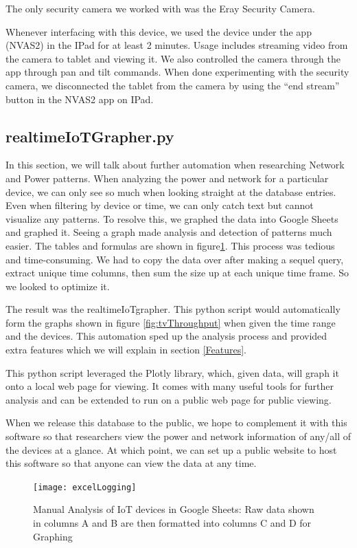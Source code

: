 The only security camera we worked with was the Eray Security Camera.

Whenever interfacing with this device, we used the device under the app (NVAS2) in the IPad for at least 2 minutes. Usage includes streaming video from the camera to tablet and viewing it. We also controlled the camera through the app through pan and tilt commands. When done experimenting with the security camera, we disconnected the tablet from the camera by using the ``end stream'' button in the NVAS2 app on IPad.

\subsection{realtimeIoTGrapher.py}
\label{realtimeIoTGrapher.py}

In this section, we will talk about further automation when researching Network and Power patterns. When analyzing the power and network for a particular device, we can only see so much when looking straight at the database entries. Even when filtering by device or time, we can only catch text but cannot visualize any patterns. To resolve this, we graphed the data into Google Sheets and graphed it. Seeing a graph made analysis and detection of patterns much easier. The tables and formulas are shown in figure\ref{fig:excelLogging}. This process was tedious and time-consuming. We had to copy the data over after making a sequel query, extract unique time columns, then sum the size up at each unique time frame. So we looked to optimize it.

The result was the realtimeIoTgrapher. This python script would automatically form the graphs shown in figure \ref{fig:tvThroughput} when given the time range and the devices. This automation sped up the analysis process and provided extra features which we will explain in section \ref{Features}.

This python script leveraged the Plotly library, which, given data, will graph it onto a local web page for viewing. It comes with many useful tools for further analysis and can be extended to run on a public web page for public viewing.

When we release this database to the public, we hope to complement it with this software so that researchers view the power and network information of any/all of the devices at a glance. At which point, we can set up a public website to host this software so that anyone can view the data at any time.

\begin{figure}[H]
    \centering
    \texttt{[image: excelLogging]}
    \caption{Manual Analysis of IoT devices in Google Sheets: Raw data shown in columns A and B are then formatted into columns C and D for Graphing}
    \label{fig:excelLogging}
\end{figure}

